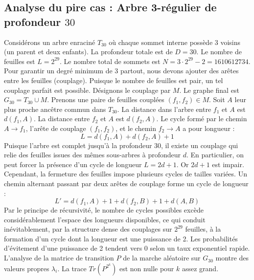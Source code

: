 \documentclass[11pt,a4paper]{article}
\begin{document}
\subsection{Analyse du pire cas : Arbre 3-régulier de profondeur $30$}
Considérons un arbre enraciné $T_{30}$ où chaque sommet interne possède 3 voisins (un parent et deux enfants).
La profondeur totale est de $D = 30$.
Le nombre de feuilles est $L = 2^{29}$.
Le nombre total de sommets est $N = 3 \cdot 2^{29} - 2 = 1610612734$.
Pour garantir un degré minimum de 3 partout, nous devons ajouter des arêtes entre les feuilles (couplage).
Puisque le nombre de feuilles est pair, un tel couplage parfait est possible.
Désignons le couplage par $M$. Le graphe final est $G_{30} = T_{30} \cup M$.
Prenons une paire de feuilles couplées $(f_1, f_2) \in M$.
Soit $A$ leur plus proche ancêtre commun dans $T_{30}$.
La distance dans l'arbre entre $f_1$ et $A$ est $d(f_1, A)$.
La distance entre $f_2$ et $A$ est $d(f_2, A)$.
Le cycle formé par le chemin $A \to f_1$, l'arête de couplage $(f_1, f_2)$, et le chemin $f_2 \to A$ a pour longueur :
$$ L = d(f_1, A) + d(f_2, A) + 1 $$
Puisque l'arbre est complet jusqu'à la profondeur $30$, il existe un couplage qui relie des feuilles issues des mêmes sous-arbres à profondeur $d$.
En particulier, on peut forcer la présence d'un cycle de longueur $L = 2d + 1$. Or $2d+1$ est impair.
Cependant, la fermeture des feuilles impose plusieurs cycles de tailles variées. Un chemin alternant passant par deux arêtes de couplage forme un cycle de longueur :
$$ L' = d(f_1, A) + 1 + d(f_2, B) + 1 + d(A, B) $$
Par le principe de récursivité, le nombre de cycles possibles excède considérablement l'espace des longueurs disponibles, ce qui conduit inévitablement, par la structure dense des couplages sur $2^{29}$ feuilles, à la formation d'un cycle dont la longueur est une puissance de 2. Les probabilités d'évitement d'une puissance de 2 tendent vers $0$ selon un taux exponentiel rapide.
L'analyse de la matrice de transition $P$ de la marche aléatoire sur $G_{30}$ montre des valeurs propres $\lambda_i$. La trace $Tr(P^{2^k})$ est non nulle pour $k$ assez grand.
\end{document}
